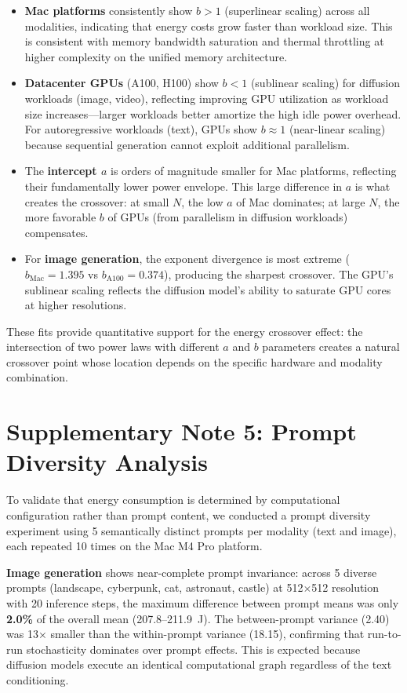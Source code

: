 \documentclass[11pt]{article}
\begin{document}
\begin{itemize}
\item \textbf{Mac platforms} consistently show $b > 1$ (superlinear scaling) across all modalities, indicating that energy costs grow faster than workload size. This is consistent with memory bandwidth saturation and thermal throttling at higher complexity on the unified memory architecture.
\item \textbf{Datacenter GPUs} (A100, H100) show $b < 1$ (sublinear scaling) for diffusion workloads (image, video), reflecting improving GPU utilization as workload size increases---larger workloads better amortize the high idle power overhead. For autoregressive workloads (text), GPUs show $b \approx 1$ (near-linear scaling) because sequential generation cannot exploit additional parallelism.
\item The \textbf{intercept $a$} is orders of magnitude smaller for Mac platforms, reflecting their fundamentally lower power envelope. This large difference in $a$ is what creates the crossover: at small $N$, the low $a$ of Mac dominates; at large $N$, the more favorable $b$ of GPUs (from parallelism in diffusion workloads) compensates.
\item For \textbf{image generation}, the exponent divergence is most extreme ($b_\text{Mac} = 1.395$ vs $b_\text{A100} = 0.374$), producing the sharpest crossover. The GPU's sublinear scaling reflects the diffusion model's ability to saturate GPU cores at higher resolutions.
\end{itemize}

These fits provide quantitative support for the energy crossover effect: the intersection of two power laws with different $a$ and $b$ parameters creates a natural crossover point whose location depends on the specific hardware and modality combination.

\clearpage
\section*{Supplementary Note 5: Prompt Diversity Analysis}

To validate that energy consumption is determined by computational configuration rather than prompt content, we conducted a prompt diversity experiment using 5 semantically distinct prompts per modality (text and image), each repeated 10 times on the Mac M4 Pro platform.

\textbf{Image generation} shows near-complete prompt invariance: across 5 diverse prompts (landscape, cyberpunk, cat, astronaut, castle) at 512$\times$512 resolution with 20 inference steps, the maximum difference between prompt means was only \textbf{2.0\%} of the overall mean (207.8--211.9~J). The between-prompt variance (2.40) was 13$\times$ smaller than the within-prompt variance (18.15), confirming that run-to-run stochasticity dominates over prompt effects. This is expected because diffusion models execute an identical computational graph regardless of the text conditioning.
\end{document}
